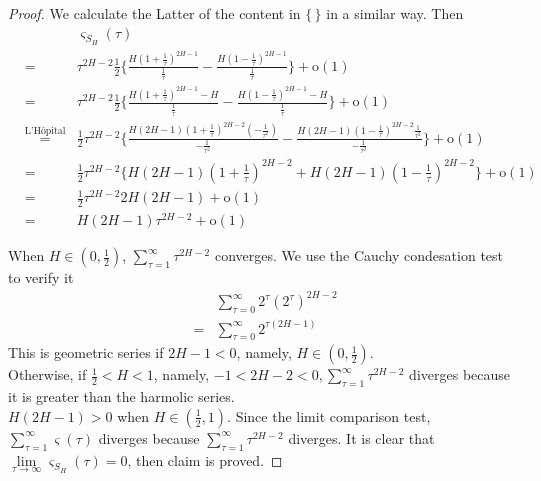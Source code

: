 \documentclass[a4paper, twoside, 11pt]{article}
\theoremstyle{definition}
\begin{document}
\begin{proof}
We calculate the Latter of the content in $\{\,\}$ in a similar way. Then
\begin{eqnarray*}
  &&\varsigma_{S_H}(\tau)\\
&=& \tau^{2H-2} \frac{1}{2}\{ \frac{H(1 +\frac{1}{\tau})^{2H-1}}{\frac{1}{\tau}} - \frac{H(1-\frac{1}{\tau})^{2H-1}}{\frac{1}{\tau}}\}+ \mathrm{o}(1)\\
&=& \tau^{2H-2} \frac{1}{2}\{ \frac{H(1 +\frac{1}{\tau})^{2H-1}- H}{\frac{1}{\tau}} - \frac{H(1-\frac{1}{\tau})^{2H-1} - H}{\frac{1}{\tau}}\}+ \mathrm{o}(1)\\
&\overset{\text{L'H\^opital}}{=}& \frac{1}{2} \tau^{2H-2}\{\frac{H(2H-1)(1+\frac{1}{\tau})^{2H-2}(-\frac{1}{\tau^2})}{-\frac{1}{\tau^2}} - \frac{H(2H-1)(1-\frac{1}{\tau})^{2H-2}\frac{1}{\tau^2}}{-\frac{1}{\tau^2}}\}+ \mathrm{o}(1)\\
&=& \frac{1}{2} \tau^{2H-2}\{H(2H-1)(1+\frac{1}{\tau})^{2H-2} + H(2H-1)(1-\frac{1}{\tau})^{2H-2}\}+ \mathrm{o}(1)\\
&=& \frac{1}{2} \tau^{2H-2} 2H(2H-1)+ \mathrm{o}(1)\\
&=& H(2H-1) \tau^{2H-2}+ \mathrm{o}(1)
\end{eqnarray*}



When $H \in (0, \frac{1}{2})$, $\sum\limits_{\tau=1}^{\infty} \tau^{2H-2}$ converges.  We use the Cauchy condesation test to verify it
 \begin{eqnarray*}
&& \sum_{\tau=0}^{\infty} 2^{\tau} (2^\tau)^{2H-2} \\
&=& \sum_{\tau=0}^{\infty} 2^{\tau(2H-1)}
\end{eqnarray*}
This is geometric series if $2H-1<0$, namely, $H\in(0,\frac{1}{2})$.  \\
Otherwise, if $\frac{1}{2} < H < 1$, namely, $-1<2H-2<0, \sum\limits_{\tau=1}^{\infty} \tau^{2H-2} $ diverges because it is greater than the harmolic series.\\
$H(2H-1) > 0$ when $H\in (\frac{1}{2}, 1)$. Since the limit comparison test, $\sum\limits_{\tau=1}^{\infty} \varsigma(\tau)$ diverges because $\sum\limits_{\tau=1}^{\infty} \tau^{2H-2} $ diverges. It is clear that $\lim\limits_{\tau\rightarrow \infty}\varsigma_{S_H}(\tau)=0$, then claim is proved. 
\end{proof}
\end{document}
